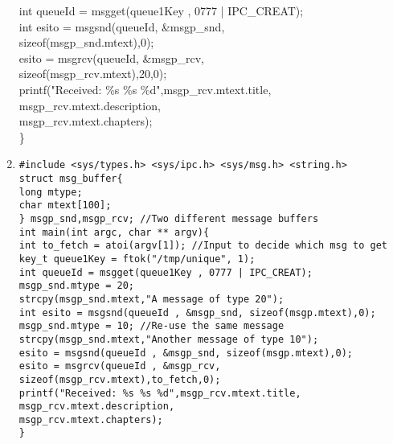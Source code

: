 \begin{flushleft}
\begin{flushleft}
\begin{enumerate}
{            \halftab int queueId = msgget(queue1Key , 0777 | IPC\_CREAT);\\
            \halftab int esito = msgsnd(queueId, \&msgp\_snd,\\ \tab \tab\tab sizeof(msgp\_snd.mtext),0);\\
            \halftab esito = msgrcv(queueId, \&msgp\_rcv, \\ \tab \tab \tab sizeof(msgp\_rcv.mtext),20,0);\\
            \halftab printf("Received: \%s \%s \%d\n",msgp\_rcv.mtext.title,\\
                    \tab\tab msgp\_rcv.mtext.description, \\ \tab \tab msgp\_rcv.mtext.chapters);\\
            \} }
      \item \texttt{\#include <sys/types.h> <sys/ipc.h> <sys/msg.h> <string.h> \\
      struct msg\_buffer\{  \\
      \halftab long mtype; \\
      \halftab char mtext[100]; \\
      \} msgp\_snd,msgp\_rcv; //Two different message buffers\\
      int main(int argc, char ** argv)\{\\
      \halftab int to\_fetch = atoi(argv[1]); //Input to decide which msg to get\\
      \halftab key\_t queue1Key = ftok("/tmp/unique", 1);\\
      \halftab int queueId = msgget(queue1Key , 0777 | IPC\_CREAT);\\
      \halftab msgp\_snd.mtype = 20;\\
      \halftab strcpy(msgp\_snd.mtext,"A message of type 20");\\
      \halftab int esito = msgsnd(queueId , \&msgp\_snd, sizeof(msgp.mtext),0);\\
      \halftab msgp\_snd.mtype = 10; //Re-use the same message\\
      \halftab strcpy(msgp\_snd.mtext,"Another message of type 10");\\
      \halftab esito = msgsnd(queueId , \&msgp\_snd, sizeof(msgp.mtext),0);\\
      \halftab esito = msgrcv(queueId , \&msgp\_rcv, sizeof(msgp\_rcv.mtext),to\_fetch,0);\\
      \halftab printf("Received: \%s \%s \%d\n",msgp\_rcv.mtext.title,\\
                \tab \tab msgp\_rcv.mtext.description,\\ \tab \tab msgp\_rcv.mtext.chapters);\\
      \} }
    \end{enumerate} 
  \end{flushleft}

\end{flushleft}
